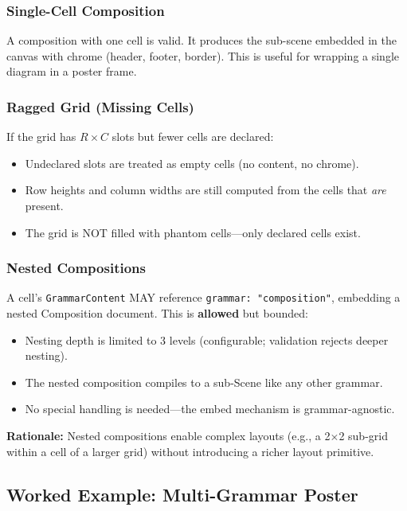\subsubsection{Single-Cell Composition}

A composition with one cell is valid.  It produces the sub-scene embedded in the canvas with chrome (header, footer, border).  This is useful for wrapping a single diagram in a poster frame.

\subsubsection{Ragged Grid (Missing Cells)}

If the grid has $R \times C$ slots but fewer cells are declared:
\begin{itemize}
  \item Undeclared slots are treated as empty cells (no content, no chrome).
  \item Row heights and column widths are still computed from the cells that \emph{are} present.
  \item The grid is NOT filled with phantom cells---only declared cells exist.
\end{itemize}

\subsubsection{Nested Compositions}

A cell's \texttt{GrammarContent} MAY reference \texttt{grammar: "composition"}, embedding a nested Composition document.  This is \textbf{allowed} but bounded:
\begin{itemize}
  \item Nesting depth is limited to 3 levels (configurable; validation rejects deeper nesting).
  \item The nested composition compiles to a sub-Scene like any other grammar.
  \item No special handling is needed---the embed mechanism is grammar-agnostic.
\end{itemize}

\textbf{Rationale:} Nested compositions enable complex layouts (e.g., a 2$\times$2 sub-grid within a cell of a larger grid) without introducing a richer layout primitive.

\subsection{Worked Example: Multi-Grammar Poster}
\label{sec:composition-example}

